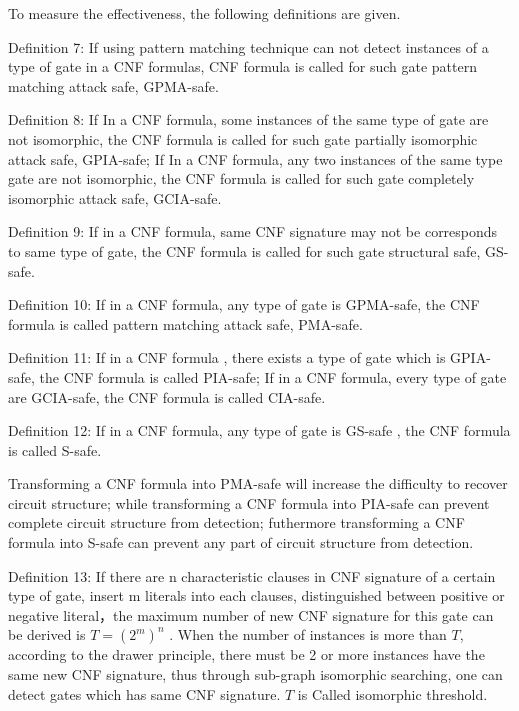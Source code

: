 \documentclass[runningheads,a4paper]{llncs}
\begin{document}
To measure the effectiveness, the following definitions are given.

\noindent \newline Definition 7: If using pattern matching technique can not detect instances of a type of gate in a CNF formulas, CNF formula is called for such gate pattern matching attack safe, GPMA-safe.

\noindent \newline Definition 8: If In a CNF formula, some instances of the same type of gate are not isomorphic, the CNF formula is called for such gate partially isomorphic attack safe, GPIA-safe; If In a CNF formula, any two instances of the same type gate are not isomorphic, the CNF formula is called for such gate completely isomorphic attack safe, GCIA-safe.

\noindent \newline Definition 9: If in a CNF formula, same CNF signature may not be corresponds to same type of gate, the CNF formula is called for such gate structural safe, GS-safe.

\noindent \newline Definition 10: If in a CNF formula, any type of gate is GPMA-safe, the CNF formula is called pattern matching attack safe, PMA-safe.

\noindent \newline Definition 11: If in a CNF formula , there exists a type of gate which is GPIA-safe, the CNF formula is called PIA-safe; If in a CNF formula, every type of gate are GCIA-safe, the CNF formula is called CIA-safe.

\noindent \newline Definition 12: If in a CNF formula, any type of gate is GS-safe , the CNF formula is called S-safe. \noindent \newline {}  

Transforming a CNF formula into PMA-safe will increase the difficulty to recover circuit structure; while transforming a CNF formula into PIA-safe can prevent complete circuit structure from detection; futhermore  transforming a CNF formula into S-safe can prevent any part of circuit structure from detection.

\noindent \newline Definition 13: If there are n characteristic clauses in CNF signature of a certain type of gate, insert m literals into each clauses, 
distinguished between positive or negative literal，the maximum number of new CNF signature for this gate can be derived is $T=(2^m)^n$ .
When the number of instances is more than $T$, according to the drawer principle, 
there must be 2 or more instances have the same new CNF signature, 
thus through sub-graph isomorphic searching, one can detect gates which has same CNF signature.
$T$ is Called isomorphic threshold.
\end{document}
